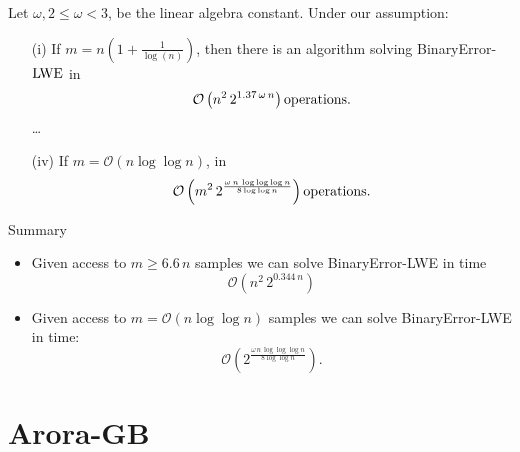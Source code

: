 \documentclass[10pt]{beamer}
\newcommand{\bigO}[1]{\ensuremath{\mathcal{O}\left({#1}\right)}\xspace}
\newcommand{\nbvar}{n}
\newcommand{\nbeq}{m}
\newcommand\LWE{\ensuremath{{\rm LWE}}\xspace}
\newcommand{\cemph}[1]{{\color{yellow9}{\bf #1}}\xspace}
\begin{document}
\begin{frame}[allowframebreaks]
\framebreak

\begin{theorem} \label{theo:bounded_lwe}
Let $\omega, 2 \leq \omega < 3$, be the linear algebra constant. Under our assumption:
\begin{itemize}
\item[(i)] If $\nbeq=\nbvar\left(1+\frac{1}{\log(\nbvar)}\right)$, then there is an algorithm solving {\rm BinaryError}-\LWE{} in
\begin{eqnarray}\label{cplxgb:0}
\bigO{n^2 \, 2^{1.37 \,  \omega \, \nbvar}} \textnormal{operations}.    
\end{eqnarray}
\dots
\item[(iv)] If $\nbeq=\bigO{\nbvar \log \log \nbvar}$, in
\begin{eqnarray}\label{cplxgb:3}
\bigO{m^2 \, 2^{\frac{\omega \, \nbvar \, \log \log \log \nbvar }{8 \log \log \nbvar}}} \textnormal{operations}.
\end{eqnarray}
\end{itemize}
\end{theorem}
\end{frame}

\begin{frame}{Summary}

\begin{itemize}
  \item Given access to $\nbeq \geq 6.6\, \nbvar $ samples we can solve BinaryError-LWE in time {\Large $$\bigO{n^2 \, 2^{0.344 \, \nbvar}}$$}
  \item Given access to $m= \bigO{n \log\log n}$ samples we can solve BinaryError-LWE in \cemph{subexponential} time:
  {\Large $$\bigO{2^{\frac{\omega \, n \, \log \log \log n }{8 \log \log n}}}.$$}
\end{itemize}

\end{frame}


\section{Arora-GB}
\end{document}
